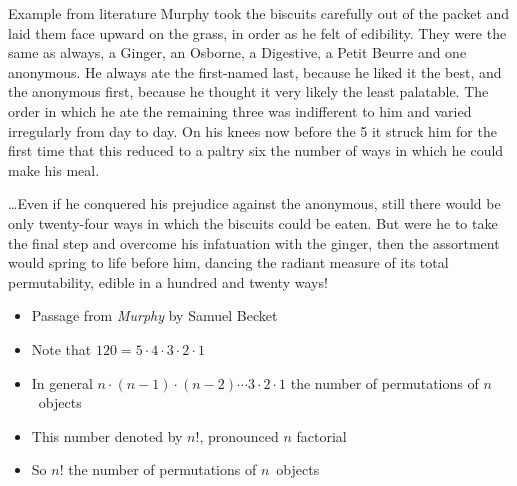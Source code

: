 \documentclass[handout]{beamer}
\theoremstyle{definition}
\begin{document}
\begin{frame}{Example from literature}
Murphy took the biscuits carefully out of the packet and laid them face
upward on the grass, in order as he felt of edibility. They were
the same as always, a Ginger, an Osborne, a Digestive, a Petit
Beurre and one anonymous. He always ate the first-named last, because
he liked it the best, and the anonymous first, because he thought
it very likely the least palatable. The order in which he ate the
remaining three was indifferent to him and varied irregularly from
day to day. On his knees now before the 5 it struck him for the
first time that this reduced to a paltry six the number of ways in
which he could make his meal.
\end{frame}
\begin{frame}
\dots Even if he conquered his
prejudice against the anonymous, still there would be only twenty-four
ways in which the biscuits could be eaten. But were he to take the
final step and overcome his infatuation with the ginger, then the
assortment would spring to life before him, dancing the radiant
measure of its total permutability, edible in a hundred and twenty
ways!
\begin{itemize}
\item Passage from {\em Murphy} by Samuel Becket
\item Note that $120=5\cdot 4\cdot 3\cdot 2\cdot 1$
\item In general $n\cdot\left(n-1\right)\cdot\left(n-2\right)
\cdots 3\cdot 2\cdot 1$ the number of permutations of $n$~objects
\item This number denoted by $n!$, pronounced \alert{$n$ factorial}
\item So $n!$ the number of permutations of $n$~objects
\end{itemize}
\end{frame}
\end{document}
